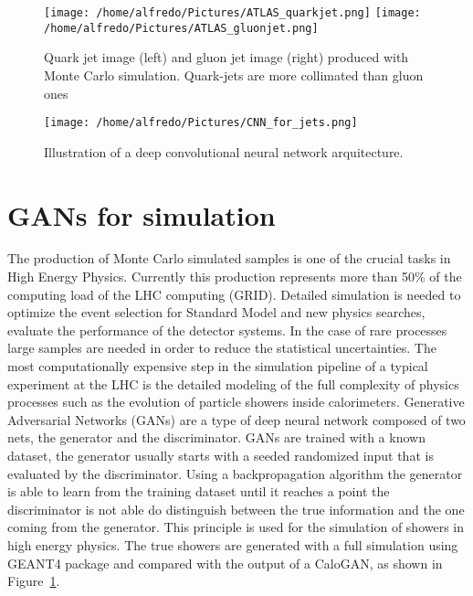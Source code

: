 \documentclass{PoS}
\begin{document}
\begin{figure}
\begin{center}
  \texttt{[image: /home/alfredo/Pictures/ATLAS\_quarkjet.png]}
  \texttt{[image: /home/alfredo/Pictures/ATLAS\_gluonjet.png]}
  \caption{Quark jet image (left) and gluon jet image (right) produced with Monte Carlo simulation. Quark-jets are more collimated than gluon ones}
  \label{fig:jet_images}
\end{center}
\end{figure}


\begin{figure}
\begin{center}
  \texttt{[image: /home/alfredo/Pictures/CNN\_for\_jets.png]}
  \caption{Illustration of a deep convolutional neural network arquitecture.}
  \label{fig:cnn_schema}
\end{center}
\end{figure}






\section{GANs for simulation}

The production of Monte Carlo simulated samples is one of the crucial tasks in High Energy Physics. Currently this production represents
more than 50\% of the computing load of the LHC computing (GRID). Detailed simulation is needed to optimize the event selection for Standard
Model and new physics searches, evaluate the performance of the detector systems. In the case of rare processes large samples are needed in
order to reduce the statistical uncertainties. The most computationally expensive step in the simulation pipeline of a typical experiment at the
LHC is the detailed modeling of the full complexity of physics processes such as the evolution of particle showers inside calorimeters. 
Generative Adversarial Networks (GANs) are a type of deep neural network composed of two nets, the generator and the discriminator.  GANs are
trained with a known dataset, the generator usually starts with a seeded randomized input that is evaluated by the discriminator. Using a
backpropagation algorithm the generator is able to learn from the training dataset until it reaches a point the discriminator is not able do
distinguish between the true information and the one coming from the generator.  This principle is used for the simulation of showers in
high energy physics.  The true showers are generated with a full simulation using GEANT4 package and compared with the output of a CaloGAN,
as shown in Figure~\ref{fig:jet_images}.
\end{document}
